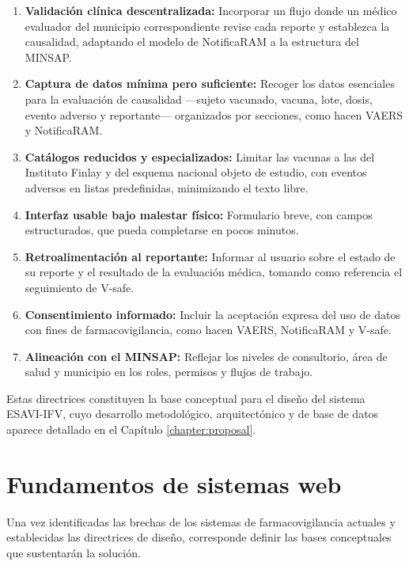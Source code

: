 \begin{enumerate}[label=\textbf{D-\arabic*}]
\item \textbf{Validación clínica descentralizada:} Incorporar un flujo donde un médico evaluador del municipio correspondiente revise cada reporte y establezca la causalidad, adaptando el modelo de NotificaRAM a la estructura del MINSAP.

\item \textbf{Captura de datos mínima pero suficiente:} Recoger los datos esenciales para la evaluación de causalidad —sujeto vacunado, vacuna, lote, dosis, evento adverso y reportante— organizados por secciones, como hacen VAERS y NotificaRAM.

\item \textbf{Catálogos reducidos y especializados:} Limitar las vacunas a las del Instituto Finlay y del esquema nacional objeto de estudio, con eventos adversos en listas predefinidas, minimizando el texto libre.

\item \textbf{Interfaz usable bajo malestar físico:} Formulario breve, con campos estructurados, que pueda completarse en pocos minutos.

\item \textbf{Retroalimentación al reportante:} Informar al usuario sobre el estado de su reporte y el resultado de la evaluación médica, tomando como referencia el seguimiento de V-safe.

\item \textbf{Consentimiento informado:} Incluir la aceptación expresa del uso de datos con fines de farmacovigilancia, como hacen VAERS, NotificaRAM y V-safe.

\item \textbf{Alineación con el MINSAP:} Reflejar los niveles de consultorio, área de salud y municipio en los roles, permisos y flujos de trabajo.
\end{enumerate}

Estas directrices constituyen la base conceptual para el diseño del sistema ESAVI-IFV, cuyo desarrollo metodológico, arquitectónico y de base de datos aparece detallado en el Capítulo \ref{chapter:proposal}.


\section{Fundamentos de sistemas web}

Una vez identificadas las brechas de los sistemas de farmacovigilancia actuales y establecidas las directrices de diseño, corresponde definir las bases conceptuales que sustentarán la solución.

